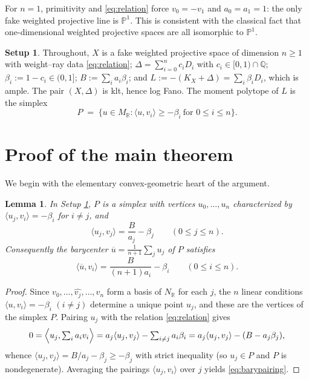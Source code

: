 \documentclass[11pt]{amsart}
\newtheorem{lemma}[theorem]{Lemma}
\theoremstyle{definition}
\newtheorem{setup}[theorem]{Setup}
\theoremstyle{remark}
\newcommand{\NR}{N_{\mathbb{R}}}
\newcommand{\MReal}{M_{\mathbb{R}}}
\newcommand{\Q}{\mathbb{Q}}
\newcommand{\PP}{\mathbb{P}}
\newcommand{\bary}{\overline{u}}
\begin{document}
For \(n=1\), primitivity and \eqref{eq:relation} force
\(v_0=-v_1\) and \(a_0=a_1=1\): the only fake weighted projective line is
\(\PP^1\). This is consistent with the classical fact that
one-dimensional weighted projective spaces are all isomorphic to
\(\PP^1\).

\begin{setup}\label{setup}
Throughout, \(X\) is a fake weighted projective space of dimension
\(n\ge1\) with weight--ray data \eqref{eq:relation};
\(\Delta=\sum_{i=0}^n c_iD_i\) with \(c_i\in[0,1)\cap\Q\);
\(\beta_i:=1-c_i\in(0,1]\); \(B:=\sum_i a_i\beta_i\); and
\(L:=-(K_X+\Delta)=\sum_i\beta_iD_i\), which is ample. The pair
\((X,\Delta)\) is klt, hence log Fano. The moment polytope of \(L\) is the
simplex
\[
P \;=\;\{u\in\MReal : \langle u,v_i\rangle\ge-\beta_i \ \text{for }
0\le i\le n\}.
\]
\end{setup}

\section{Proof of the main theorem}\label{sec:proof}

We begin with the elementary convex-geometric heart of the argument.

\begin{lemma}\label{lem:vertex}
In Setup \textup{\ref{setup}}, \(P\) is a simplex with vertices
\(u_0,\dots,u_n\) characterized by
\(\langle u_j,v_i\rangle=-\beta_i\) for \(i\ne j\), and
\[
\langle u_j, v_j\rangle = \frac{B}{a_j}-\beta_j
\qquad (0\le j\le n).
\]
Consequently the barycenter \(\bary=\frac{1}{n+1}\sum_j u_j\) of \(P\)
satisfies
\begin{equation}\label{eq:barypairing}
\langle\bary, v_i\rangle = \frac{B}{(n+1)a_i}-\beta_i
\qquad (0\le i\le n).
\end{equation}
\end{lemma}

\begin{proof}
Since \(v_0,\dots,\widehat{v_j},\dots,v_n\) form a basis of \(\NR\)
for each \(j\), the \(n\) linear conditions
\(\langle u,v_i\rangle=-\beta_i\) \((i\ne j)\) determine a unique point
\(u_j\), and these are the vertices of the simplex \(P\). Pairing \(u_j\)
with the relation \eqref{eq:relation} gives
\[
0=\Bigl\langle u_j,\textstyle\sum_i a_iv_i\Bigr\rangle
= a_j\langle u_j,v_j\rangle-\sum_{i\ne j}a_i\beta_i
= a_j\langle u_j,v_j\rangle-(B-a_j\beta_j),
\]
whence \(\langle u_j,v_j\rangle = B/a_j-\beta_j\ge -\beta_j\) with strict
inequality (so \(u_j\in P\) and \(P\) is nondegenerate). Averaging the
pairings \(\langle u_j,v_i\rangle\) over \(j\) yields
\eqref{eq:barypairing}.
\end{proof}
\end{document}
